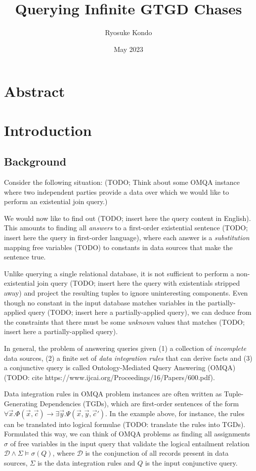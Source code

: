 \documentclass[12pt]{article}
\title{Querying Infinite GTGD Chases}
\author{Ryosuke Kondo}
\date{May 2023}
\begin{document}
\maketitle

\newpage
\tableofcontents
\newpage

\section*{Abstract}

\newpage
\section{Introduction}

\subsection{Background}

Consider the following situation: (TODO; Think about some OMQA instance where two independent parties provide a data over which we would like to perform an existential join query.)

We would now like to find out (TODO; insert here the query content in English). This amounts to finding all \emph{answers} to a first-order existential sentence (TODO; insert here the query in first-order language), where each answer is a \emph{substitution} mapping free variables (TODO) to constants in data sources that make the sentence true.

Unlike querying a single relational database, it is not sufficient to perform a non-existential join query (TODO; insert here the query with existentials stripped away) and project the resulting tuples to ignore uninteresting components. Even though no constant in the input database matches variables in the partially-applied query (TODO; insert here a partially-applied query), we can deduce from the constraints that there must be some \emph{unknown} values that matches (TODO; insert here a partially-applied query).

In general, the problem of answering queries given (1) a collection of \emph{incomplete} data sources, (2) a finite set of \emph{data integration rules} that can derive facts and (3) a conjunctive query is called Ontology-Mediated Query Answering (OMQA) (TODO: cite https://www.ijcai.org/Proceedings/16/Papers/600.pdf).

Data integration rules in OMQA problem instances are often written as Tuple-Generating Dependencies (TGDs), which are first-order sentences of the form $\forall \vec{x}. \Phi(\vec{x}, \vec{c}) \rightarrow \exists \vec{y}. \Psi(\vec{x}, \vec{y}, \vec{c}')$. In the example above, for instance, the rules can be translated into logical formulae (TODO: translate the rules into TGDs). Formulated this way, we can think of OMQA problems as finding all assignments $\sigma$ of free variables in the input query that validate the logical entailment relation $\mathcal{D} \land \Sigma \models \sigma(Q)$, where $\mathcal{D}$ is the conjunction of all records present in data sources, $\Sigma$ is the data integration rules and $Q$ is the input conjunctive query.
\end{document}
